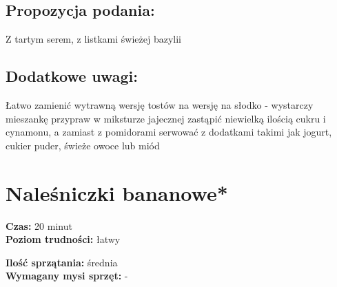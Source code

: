\documentclass[a4paper,10pt]{book}
\begin{document}
\vspace{0.5cm} 

\small
\section*{Propozycja podania:}
Z tartym serem, z listkami świeżej bazylii

\vspace{0.3cm}

\section*{Dodatkowe uwagi:}
Łatwo zamienić wytrawną wersję tostów na wersję na słodko - wystarczy mieszankę przypraw w miksturze jajecznej zastąpić niewielką ilością cukru i cynamonu, a zamiast z pomidorami serwować z dodatkami takimi jak jogurt, cukier puder, świeże owoce lub miód

\chapter{Naleśniczki bananowe*}

\vspace{0.1cm}
\small
\begin{minipage}{0.45\textwidth}
    \noindent \textbf{Czas:} 20 minut \\
    \textbf{Poziom trudności:} łatwy
\end{minipage}
\begin{minipage}{0.45\textwidth}
    \noindent \textbf{Ilość sprzątania:} średnia \\
    \textbf{Wymagany mysi sprzęt:} -
\end{minipage}
\normalsize
\vspace{0.5cm}
\end{document}
